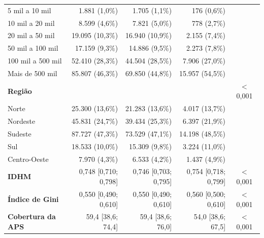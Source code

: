\begin{longtable}{@{}l@{\extracolsep{\fill}}rrrc@{}}
        \hspace{3mm}5 mil a 10 mil & 1.881 (1,0\%) & 1.705 (1,1\%) & 176 (0,6\%) &  \\
        \hspace{3mm}10 mil a 20 mil & 8.599 (4,6\%) & 7.821 (5,0\%) & 778 (2,7\%) &  \\
        \hspace{3mm}20 mil a 50 mil & 19.095 (10,3\%) & 16.940 (10,9\%) & 2.155 (7,4\%) &  \\
        \hspace{3mm}50 mil a 100 mil & 17.159 (9,3\%) & 14.886 (9,5\%) & 2.273 (7,8\%) &  \\
        \hspace{3mm}100 mil a 500 mil & 52.410 (28,3\%) & 44.504 (28,5\%) & 7.906 (27,0\%) &  \\
        \hspace{3mm}Mais de 500 mil & 85.807 (46,3\%) & 69.850 (44,8\%) & 15.957 (54,5\%) &  \\
        \textbf{Região} &  &  &  & $<$ 0,001 \\
        \hspace{3mm}Norte & 25.300 (13,6\%) & 21.283 (13,6\%) & 4.017 (13,7\%) &  \\
        \hspace{3mm}Nordeste & 45.831 (24,7\%) & 39.434 (25,3\%) & 6.397 (21,9\%) &  \\
        \hspace{3mm}Sudeste & 87.727 (47,3\%) & 73.529 (47,1\%) & 14.198 (48,5\%) &  \\
        \hspace{3mm}Sul & 18.533 (10,0\%) & 15.309 (9,8\%) & 3.224 (11,0\%) &  \\
        \hspace{3mm}Centro-Oeste & 7.970 (4,3\%) & 6.533 (4,2\%) & 1.437 (4,9\%) &  \\
        \textbf{IDHM} & 0,748 [0,710; 0,798] & 0,746 [0,703; 0,795] & 0,754 [0,718; 0,799] & $<$ 0,001 \\
        \textbf{Índice de Gini} & 0,550 [0,490; 0,610] & 0,550 [0,490; 0,610] & 0,560 [0,500; 0,610] & $<$ 0,001 \\
        \textbf{Cobertura da APS} & 59,4 [38,6; 74,4] & 59,4 [38,6; 76,0] & 54,0 [38,6; 67,5] & $<$ 0,001 \\
\end{longtable}
\endgroup

